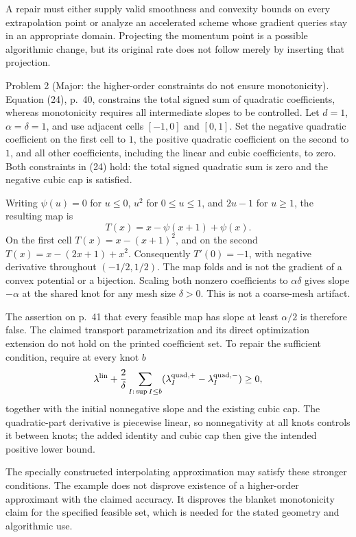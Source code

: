 \documentclass[10pt]{article}
\begin{document}
A repair must either supply valid smoothness and convexity bounds on every extrapolation point or analyze an accelerated scheme whose gradient queries stay in an appropriate domain. Projecting the momentum point is a possible algorithmic change, but its original rate does not follow merely by inserting that projection.\par
Problem 2 (Major: the higher-order constraints do not ensure monotonicity).  Equation (24), p. 40, constrains the total signed sum of quadratic coefficients, whereas monotonicity requires all intermediate slopes to be controlled. Let \(d=1\), \(\alpha=\delta=1\), and use adjacent cells \([-1,0]\) and \([0,1]\). Set the negative quadratic coefficient on the first cell to \(1\), the positive quadratic coefficient on the second to \(1\), and all other coefficients, including the linear and cubic coefficients, to zero. Both constraints in (24) hold: the total signed quadratic sum is zero and the negative cubic cap is satisfied.\par
Writing \(\psi(u)=0\) for \(u\leq0\), \(u^2\) for \(0\leq u\leq1\), and \(2u-1\) for \(u\geq1\), the resulting map is \[T(x)=x-\psi(x+1)+\psi(x).\] On the first cell \(T(x)=x-(x+1)^2\), and on the second \(T(x)=x-(2x+1)+x^2\). Consequently \(T'(0)=-1\), with negative derivative throughout \((-1/2,1/2)\). The map folds and is not the gradient of a convex potential or a bijection. Scaling both nonzero coefficients to \(\alpha\delta\) gives slope \(-\alpha\) at the shared knot for any mesh size \(\delta>0\). This is not a coarse-mesh artifact.\par
The assertion on p. 41 that every feasible map has slope at least \(\alpha/2\) is therefore false. The claimed transport parametrization and its direct optimization extension do not hold on the printed coefficient set. To repair the sufficient condition, require at every knot \(b\) \[\lambda^{\rm lin}
 +\frac2\delta\sum_{I:\,\sup I\leq b}
       (\lambda_I^{\rm quad,+}-\lambda_I^{\rm quad,-})\geq0,\] together with the initial nonnegative slope and the existing cubic cap. The quadratic-part derivative is piecewise linear, so nonnegativity at all knots controls it between knots; the added identity and cubic cap then give the intended positive lower bound.\par
The specially constructed interpolating approximation may satisfy these stronger conditions. The example does not disprove existence of a higher-order approximant with the claimed accuracy. It disproves the blanket monotonicity claim for the specified feasible set, which is needed for the stated geometry and algorithmic use.\par
\end{document}
